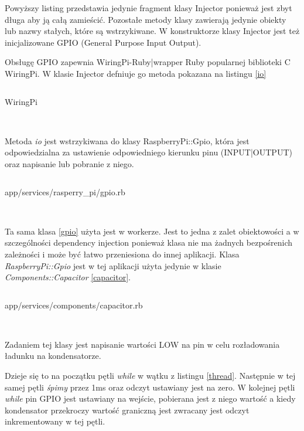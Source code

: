 \documentclass[11pt,a4paper, twoside]{article}
\begin{document}
Powyższy listing przedstawia jedynie fragment klasy Injector ponieważ jest zbyt długa aby ją całą zamieścić. Pozostałe metody klasy zawierają jedynie obiekty lub nazwy stałych, które są wstrzykiwane. W konstruktorze klasy Injector jest też inicjalizowane GPIO (General Purpose Input Output).

Obsługę GPIO zapewnia WiringPi-Ruby|wrapper Ruby popularnej biblioteki C WiringPi. W klasie Injector defniuje go metoda pokazana na listingu \ref{io}

\begin{listing}[H]
\inputminted[linenos=true]{ruby}{./src/io.rb}
\caption{WiringPi}
$\label{io}$
\end{listing}

Metoda \emph{io} jest wstrzykiwana do klasy RaspberryPi::Gpio, która jest odpowiedzialna za ustawienie odpowiedniego kierunku pinu (INPUT|OUTPUT) oraz napisanie lub pobranie z niego.

\begin{listing}[H]
\inputminted[linenos=true]{ruby}{./src/gpio.rb}
\caption{app/services/rasperry\_pi/gpio.rb}
$\label{gpio}$
\end{listing}

Ta sama klasa \ref{gpio} użyta jest w workerze. Jest to jedna z zalet obiektowości a w szczególności dependency injection ponieważ klasa nie ma żadnych bezpośrenich zależności i może być łatwo przeniesiona do innej aplikacji. Klasa \emph{RaspberryPi::Gpio} jest w tej aplikacji użyta jedynie w klasie \emph{Components::Capacitor} \ref{capacitor}.
\begin{listing}[H]
\inputminted[linenos=true]{ruby}{./src/capacitor.rb}
\caption{app/services/components/capacitor.rb}
$\label{capacitor}$
\end{listing}

Zadaniem tej klasy jest napisanie wartości LOW na pin w celu rozładowania ładunku na kondensatorze. 

 
Dzieje się to na początku pętli \emph{while} w wątku z listingu \ref{thread}. Następnie w tej samej pętli \emph{śpimy} przez 1ms oraz odczyt ustawiany jest na zero. W kolejnej pętli \emph{while} pin GPIO jest ustawiany na wejście, pobierana jest z niego wartość a kiedy kondensator przekroczy wartość graniczną jest zwracany jest odczyt inkrementowany w tej pętli. 
 
\end{document}
